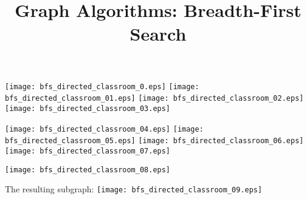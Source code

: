 \documentclass{article}
\title{Graph Algorithms: Breadth-First Search}
\begin{document}
\maketitle
{}\vspace{1em}


\vspace{1em}


\texttt{[image: bfs\_directed\_classroom\_0.eps]}
\vspace{1em}
\texttt{[image: bfs\_directed\_classroom\_01.eps]}
\vspace{1em}
\texttt{[image: bfs\_directed\_classroom\_02.eps]}
\vspace{1em}
\texttt{[image: bfs\_directed\_classroom\_03.eps]}
\vspace{1em}


\texttt{[image: bfs\_directed\_classroom\_04.eps]}
\vspace{1em}
\texttt{[image: bfs\_directed\_classroom\_05.eps]}
\vspace{1em}
\texttt{[image: bfs\_directed\_classroom\_06.eps]}
\vspace{1em}
\texttt{[image: bfs\_directed\_classroom\_07.eps]}
\vspace{1em}


\texttt{[image: bfs\_directed\_classroom\_08.eps]}
\vspace{1em}
\begin{minipage}{0.22727272727272727\linewidth}
The resulting subgraph: 
\texttt{[image: bfs\_directed\_classroom\_09.eps]}
\end{minipage}
\end{document}
